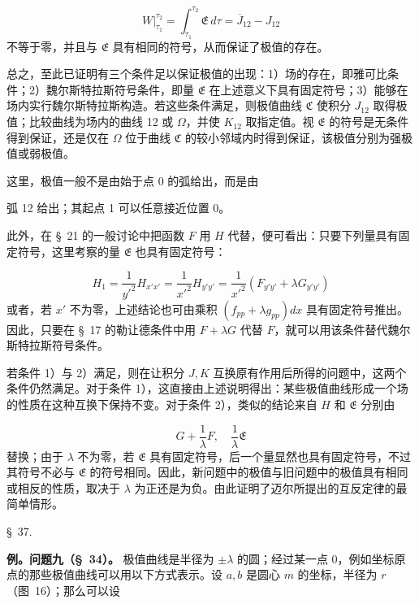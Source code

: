 \documentclass[11pt,a4paper,leqno]{article}
\begin{document}
\[
W\bigg|_{\tau_1}^{\tau_2}=\int_{\tau_1}^{\tau_2}\mathfrak{E}\,d\tau=\overline{J}_{12}-J_{12}
\]
不等于零，并且与 $\mathfrak{E}$ 具有相同的符号，从而保证了极值的存在。

总之，至此已证明有三个条件足以保证极值的出现：1）场的存在，即雅可比条件；2）魏尔斯特拉斯符号条件，即量 $\mathfrak{E}$ 在上述意义下具有固定符号；3）能够在场内实行魏尔斯特拉斯构造。若这些条件满足，则极值曲线 $\mathfrak{C}$ 使积分 $J_{12}$ 取得极值；比较曲线为场内的曲线 12 或 $\Omega$，并使 $K_{12}$ 取指定值。视 $\mathfrak{E}$ 的符号是无条件得到保证，还是仅在 $\Omega$ 位于曲线 $\mathfrak{C}$ 的较小邻域内时得到保证，该极值分别为强极值或弱极值。

这里，极值一般不是由始于点 0 的弧给出，而是由

弧 12 给出；其起点 1 可以任意接近位置 0。

此外，在 \S~21 的一般讨论中把函数 $F$ 用 $H$ 代替，便可看出：只要下列量具有固定符号，这里考察的量 $\mathfrak{E}$ 也具有固定符号：

\[
H_1=\frac{1}{y'^2}H_{x'x'}=\frac{1}{x'^2}H_{y'y'}=
\frac{1}{x'^2}(F_{y'y'}+\lambda G_{y'y'})
\]
或者，若 $x'$ 不为零，上述结论也可由乘积 $(f_{pp}+\lambda g_{pp})dx$ 具有固定符号推出。因此，只要在 \S~17 的勒让德条件中用 $F+\lambda G$ 代替 $F$，就可以用该条件替代魏尔斯特拉斯符号条件。

若条件 1）与 2）满足，则在让积分 $J,K$ 互换原有作用后所得的问题中，这两个条件仍然满足。对于条件 1），这直接由上述说明得出：某些极值曲线形成一个场的性质在这种互换下保持不变。对于条件 2），类似的结论来自 $H$ 和 $\mathfrak{E}$ 分别由

\[
G+\frac{1}{\lambda}F,
\quad
\frac{1}{\lambda}\mathfrak{E}
\]
替换；由于 $\lambda$ 不为零，若 $\mathfrak{E}$ 具有固定符号，后一个量显然也具有固定符号，不过其符号不必与 $\mathfrak{E}$ 的符号相同。因此，新问题中的极值与旧问题中的极值具有相同或相反的性质，取决于 $\lambda$ 为正还是为负。由此证明了迈尔所提出的互反定律的最简单情形。

\begin{center}
{\large \S~37.}
\end{center}
\noindent\textbf{例。问题九（\S~34）。} 极值曲线是半径为 $\pm\lambda$ 的圆；经过某一点 0，例如坐标原点的那些极值曲线可以用以下方式表示。设 $a,b$ 是圆心 $m$ 的坐标，半径为 $r$ （图~16）；那么可以设
\end{document}
